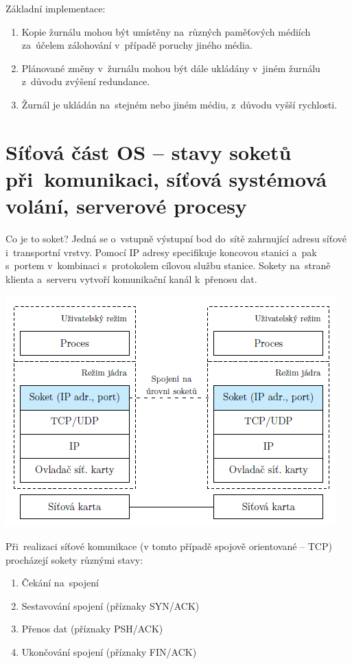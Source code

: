 Základní implementace:

\begin{enumerate}
	\item Kopie žurnálu mohou být umístěny na~různých paměťových médiích za~účelem zálohování v~případě poruchy jiného média.
	\item Plánované změny v~žurnálu mohou být dále ukládány v~jiném žurnálu z~důvodu zvýšení redundance.
	\item Žurnál je ukládán na~stejném nebo jiném médiu, z~důvodu vyšší rychlosti. 
\end{enumerate}


\clearpage
\section{Síťová část OS -- stavy soketů při~komunikaci, síťová systémová volání, serverové procesy}

Co je to soket? Jedná se o~vstupně výstupní bod do~sítě zahrnující adresu síťové i~transportní vrstvy. Pomocí IP adresy specifikuje koncovou stanici a~pak s~portem v~kombinaci s~protokolem cílovou službu stanice. Sokety na~straně klienta a~serveru vytvoří komunikační kanál k~přenosu dat.

\begin{center}
	\includegraphics[scale=1]{images/network_socket.png}
\end{center}

Při~realizaci síťové komunikace (v tomto případě spojově orientované -- TCP) procházejí sokety různými stavy:
\begin{enumerate}
	\item Čekání na~spojení
	\item Sestavování spojení (příznaky SYN/ACK)
	\item Přenos dat (příznaky PSH/ACK)
	\item Ukončování spojení (příznaky FIN/ACK)
\end{enumerate}

